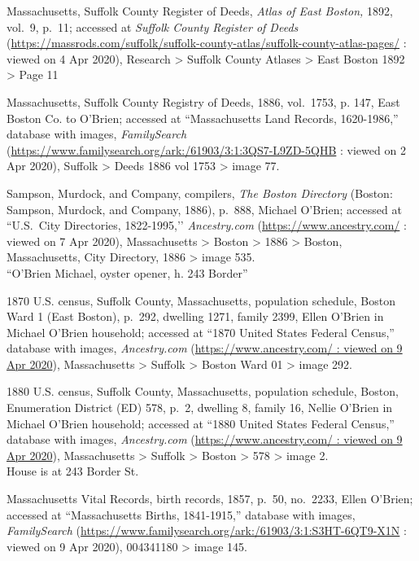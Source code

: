 \begin{thebibliography}{99}
	Massachusetts, Suffolk County Register of Deeds, \textit{Atlas of East Boston,} 1892, vol.\ 9, p.\ 11; accessed at \textit{Suffolk County Register of Deeds} (\url{https://massrods.com/suffolk/suffolk-county-atlas/suffolk-county-atlas-pages/} : viewed on 4 Apr 2020), Research > Suffolk County Atlases > East Boston 1892 > Page 11
	
	Massachusetts, Suffolk County Registry of Deeds, 1886, vol.\ 1753, p. 147, East Boston Co. to O’Brien; accessed at ``Massachusetts Land Records, 1620-1986,'' database with images, \textit{FamilySearch} (\url{https://www.familysearch.org/ark:/61903/3:1:3QS7-L9ZD-5QHB} : viewed on 2 Apr 2020), Suffolk > Deeds 1886 vol 1753 > image 77.
	
	Sampson, Murdock, and Company, compilers, \textit{The Boston Directory} (Boston: Sampson, Murdock, and Company, 1886), p.\ 888, Michael O'Brien; accessed at ``U.S.\ City Directories, 1822-1995,’’ \textit{Ancestry.com} (\url{https://www.ancestry.com/} : viewed on 7 Apr 2020), Massachusetts > Boston > 1886 > Boston, Massachusetts, City Directory, 1886 > image 535.\\
	``O'Brien Michael, oyster opener, h. 243 Border''
	
	1870 U.S. census, Suffolk County, Massachusetts, population schedule, Boston Ward 1 (East Boston), p.\ 292, dwelling 1271, family 2399, Ellen O'Brien in Michael O'Brien household; accessed at ``1870 United States Federal Census,'' database with images, \textit{Ancestry.com} (\url{https://www.ancestry.com/ : viewed on 9 Apr 2020}), Massachusetts > Suffolk > Boston Ward 01 > image 292.
	
	1880 U.S. census, Suffolk County, Massachusetts, population schedule, Boston, Enumeration District (ED) 578, p.\ 2, dwelling 8, family 16, Nellie O'Brien in Michael O'Brien household; accessed at ``1880 United States Federal Census,'' database with images, \textit{Ancestry.com} (\url{https://www.ancestry.com/ : viewed on 9 Apr 2020}), Massachusetts > Suffolk > Boston > 578 > image 2.\\
	House is at 243 Border St.
	
	Massachusetts Vital Records, birth records, 1857, p.\ 50, no.\ 2233, Ellen O'Brien; accessed at ``Massachusetts Births, 1841-1915,'' database with images, \textit{FamilySearch} (\url{https://www.familysearch.org/ark:/61903/3:1:S3HT-6QT9-X1N} : viewed on 9 Apr 2020), 004341180 > image 145.
	

\end{thebibliography}
